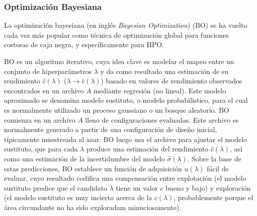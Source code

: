 \subsubsection{Optimización Bayesiana}



La optimización bayesiana (en inglés \textit{Bayesian Optimization}) (BO) se ha vuelto cada vez más popular como técnica de optimización global para funciones costosas de caja negra, y específicamente para HPO.  

BO es un algoritmo iterativo, cuya idea clave es modelar el mapeo entre un conjunto de hiperparámetros $\lambda$ y da como resultado una estimación de su rendimiento $\hat{c}(\lambda)$ ($\lambda \rightarrow \hat{c}(\lambda)$) basado en valores de rendimiento observados encontrados en un archivo $A$ mediante regresión (no lineal). Este modelo aproximado se denomina modelo sustituto, o modelo probabilístico, para el cual es normalmente utilizado un proceso gaussiano o un bosque aleatorio. BO comienza en un archivo $A$ lleno de configuraciones evaluadas. Este archivo es normalmente generado a partir de una configuración de diseño inicial, típicamente muestreada al azar. BO luego usa el archivo para ajustar el modelo sustituto, que para cada $\lambda$ produce una estimación del rendimiento $\hat{c}(\lambda)$, así como una estimación de la incertidumbre del modelo $\hat{\sigma}(\lambda)$. Sobre la base de estas predicciones, BO establece un función de adquisición $u(\lambda)$ fácil de evaluar, cuyo resultado codifica una compensación entre explotación (el modelo sustituto predice que el candidato $\lambda$ tiene un valor $c$ bueno y bajo) y exploración (el modelo sustituto es muy incierto acerca de la $c(\lambda)$, probablemente porque el área circundante no ha sido exploradam minuciosamente).

